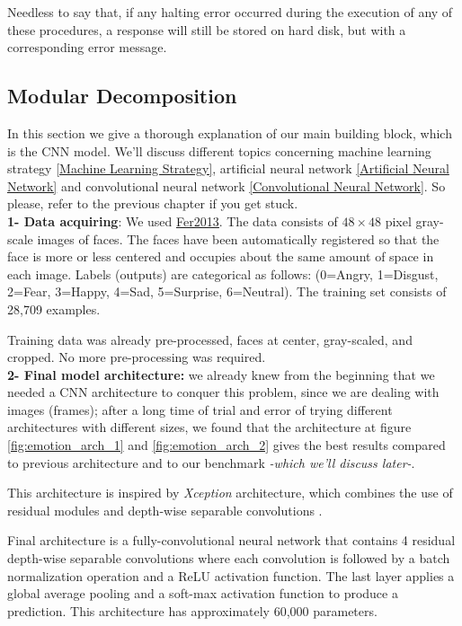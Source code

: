 Needless to say that, if any halting error occurred during the execution of any of these procedures, a response will still be stored on hard disk, but with a corresponding error message.


\subsection{Modular Decomposition}
In this section we give a thorough explanation of our main building block, which is the CNN model. We'll discuss different topics concerning machine learning strategy \ref{Machine Learning Strategy}, artificial neural network \ref{Artificial Neural Network} and convolutional neural network \ref{Convolutional Neural Network}. So please, refer to the previous chapter if you get stuck.\\

\textbf{1- Data acquiring}: We used \href{https://www.kaggle.com/c/challenges-in-representation-learning-facial-expression-recognition-challenge/data}{\underline{Fer2013}}. The data consists of $48 \times 48$ pixel gray-scale images of faces. The faces have been automatically registered so that the face is more or less centered and occupies about the same amount of space in each image. Labels (outputs) are categorical as follows: (0=Angry, 1=Disgust, 2=Fear, 3=Happy, 4=Sad, 5=Surprise, 6=Neutral). The training set consists of 28,709 examples.

Training data was already pre-processed, faces at center, gray-scaled, and cropped. No more pre-processing was required.\\

\textbf{2- Final model architecture:} we already knew from the beginning that we needed a CNN architecture to conquer this problem, since we are dealing with images (frames); after a long time of trial and error of trying different architectures with different sizes, we found that the architecture at figure \ref{fig:emotion_arch_1} and \ref{fig:emotion_arch_2} gives the best results compared to previous architecture and to our benchmark \textit{-which we'll discuss later-}.

This architecture is inspired by \textit{Xception} \cite{xception} architecture, which combines the use of residual modules \cite{He} and depth-wise separable convolutions \cite{andrew}.

Final architecture is a fully-convolutional neural network that contains 4 residual depth-wise separable convolutions where each convolution is followed by a batch normalization operation and a ReLU activation function. The last layer applies a global average pooling and a soft-max activation function to produce a prediction. This architecture has approximately 60,000 parameters.

